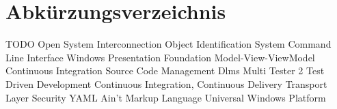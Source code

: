 \renewcommand{\chaptermark}[1]{\markboth{\spacedlowsmallcaps{#1}}{\spacedlowsmallcaps{#1}}}
\renewcommand{\sectionmark}[1]{\markright{\thesection\enspace\spacedlowsmallcaps{#1}}}
\chapter*{Abk\"{u}rzungsverzeichnis}

\begin{acronym}[UML]
   {TODO}
   {Open System Interconnection}
   {Object Identification System}
   {Command Line Interface}
   {Windows Presentation Foundation}
   {Model-View-ViewModel}
   {Continuous Integration}
   {Source Code Management}
   {Dlms Multi Tester 2}
   {Test Driven Development}
   {Continuous Integration, Continuous Delivery}
   {Transport Layer Security}
   {YAML Ain't Markup Language}
   {Universal Windows Platform}

\end{acronym}

\cleardoublepage
